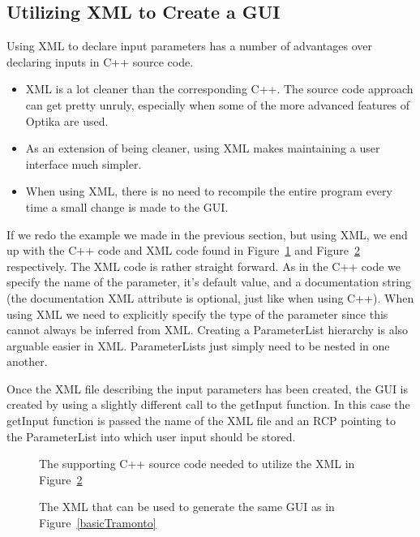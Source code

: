 \subsection{Utilizing XML to Create a GUI}
Using XML to declare input parameters has a number of advantages over declaring inputs in C++ source code.
\begin{itemize}
  \item XML is a lot cleaner than the corresponding C++. The source code approach can get pretty unruly, especially
  when some of the more advanced features of Optika are used.
  \item As an extension of being cleaner, using XML makes maintaining a user interface much simpler.
  \item When using XML, there is no need to recompile the entire program every time a small change is made to the GUI.
\end{itemize}
If we redo the example we made in the previous section, but using XML, we end up with the C++ code and XML code found in
Figure~\ref{basicXMLC++} and Figure~\ref{basicXMLXML} respectively. The XML code is rather straight forward. As in the C++ code we specify 
the name of the parameter, it's default value, and a documentation string (the documentation XML attribute is optional, just like when using 
C++). When using XML we need to explicitly specify the type
of the parameter since this cannot always be inferred from XML. Creating a ParameterList hierarchy is also arguable easier
in XML. ParameterLists just simply need to be nested in one another.

Once the XML file describing the input parameters has been created, the GUI is created by using a slightly different
call to the getInput function. In this case the getInput function is passed the name of the XML file and an RCP pointing
to the ParameterList into which user input should be stored.
\begin{figure}
{\footnotesize
\centering

}
\caption{The supporting C++ source code needed to utilize the XML in Figure~\ref{basicXMLXML}}
\label{basicXMLC++}
\end{figure}
\begin{figure}
{\footnotesize
\centering

}
\caption{The XML that can be used to generate the same GUI as in Figure~\ref{basicTramonto}}
\label{basicXMLXML}
\end{figure}

